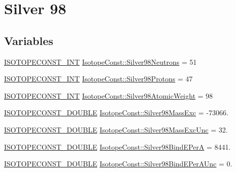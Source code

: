 \hypertarget{group___isotope_const-_silver-_ag98}{}\section{Silver 98}
\label{group___isotope_const-_silver-_ag98}
\subsection*{Variables}
\begin{DoxyCompactItemize}
\item 
\mbox{\hyperlink{group___isotope_const-_macros_ga5f18360b3e99483a35c32d789e62621c}{I\+S\+O\+T\+O\+P\+E\+C\+O\+N\+S\+T\+\_\+\+I\+NT}} \mbox{\hyperlink{group___isotope_const-_silver-_ag98_gaa10d9932ac58594eec739d8275cc7aec}{Isotope\+Const\+::\+Silver98\+Neutrons}} = 51
\item 
\mbox{\hyperlink{group___isotope_const-_macros_ga5f18360b3e99483a35c32d789e62621c}{I\+S\+O\+T\+O\+P\+E\+C\+O\+N\+S\+T\+\_\+\+I\+NT}} \mbox{\hyperlink{group___isotope_const-_silver-_ag98_ga19dd0cf259587f6010afe59369ed4b7e}{Isotope\+Const\+::\+Silver98\+Protons}} = 47
\item 
\mbox{\hyperlink{group___isotope_const-_macros_ga5f18360b3e99483a35c32d789e62621c}{I\+S\+O\+T\+O\+P\+E\+C\+O\+N\+S\+T\+\_\+\+I\+NT}} \mbox{\hyperlink{group___isotope_const-_silver-_ag98_ga63cb3e54a7540600a87c341eb21477bd}{Isotope\+Const\+::\+Silver98\+Atomic\+Weight}} = 98
\item 
\mbox{\hyperlink{group___isotope_const-_macros_ga8f45a7272ce02c0b4c65c44636ed719a}{I\+S\+O\+T\+O\+P\+E\+C\+O\+N\+S\+T\+\_\+\+D\+O\+U\+B\+LE}} \mbox{\hyperlink{group___isotope_const-_silver-_ag98_ga9adf288e885f399492f6dcb3cf59a475}{Isotope\+Const\+::\+Silver98\+Mass\+Exc}} = -\/73066.
\item 
\mbox{\hyperlink{group___isotope_const-_macros_ga8f45a7272ce02c0b4c65c44636ed719a}{I\+S\+O\+T\+O\+P\+E\+C\+O\+N\+S\+T\+\_\+\+D\+O\+U\+B\+LE}} \mbox{\hyperlink{group___isotope_const-_silver-_ag98_ga0a34c73598a09d335ce2e3f05669d429}{Isotope\+Const\+::\+Silver98\+Mass\+Exc\+Unc}} = 32.
\item 
\mbox{\hyperlink{group___isotope_const-_macros_ga8f45a7272ce02c0b4c65c44636ed719a}{I\+S\+O\+T\+O\+P\+E\+C\+O\+N\+S\+T\+\_\+\+D\+O\+U\+B\+LE}} \mbox{\hyperlink{group___isotope_const-_silver-_ag98_gaffcba211da6369bf092135bd397cffd5}{Isotope\+Const\+::\+Silver98\+Bind\+E\+PerA}} = 8441.
\item 
\mbox{\hyperlink{group___isotope_const-_macros_ga8f45a7272ce02c0b4c65c44636ed719a}{I\+S\+O\+T\+O\+P\+E\+C\+O\+N\+S\+T\+\_\+\+D\+O\+U\+B\+LE}} \mbox{\hyperlink{group___isotope_const-_silver-_ag98_ga78035b64bce3af1118b9c8206e6bf648}{Isotope\+Const\+::\+Silver98\+Bind\+E\+Per\+A\+Unc}} = 0.

\end{DoxyCompactItemize}
